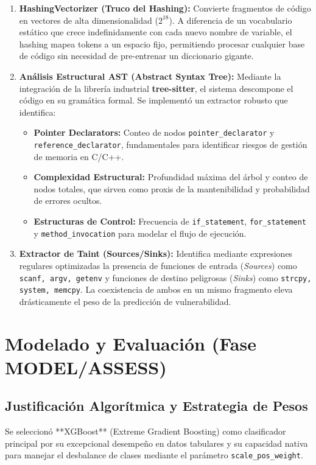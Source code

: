 \documentclass[11pt,a4paper]{article}
\begin{document}
\begin{enumerate}
    \item \textbf{HashingVectorizer (Truco del Hashing):} Convierte fragmentos de código en vectores de alta dimensionalidad ($2^{18}$). A diferencia de un vocabulario estático que crece indefinidamente con cada nuevo nombre de variable, el hashing mapea tokens a un espacio fijo, permitiendo procesar cualquier base de código sin necesidad de pre-entrenar un diccionario gigante.
    \item \textbf{Análisis Estructural AST (Abstract Syntax Tree):} Mediante la integración de la librería industrial \textbf{tree-sitter}, el sistema descompone el código en su gramática formal. Se implementó un extractor robusto que identifica:
    \begin{itemize}
        \item \textbf{Pointer Declarators:} Conteo de nodos \texttt{pointer\_declarator} y \texttt{reference\_declarator}, fundamentales para identificar riesgos de gestión de memoria en C/C++.
        \item \textbf{Complexidad Estructural:} Profundidad máxima del árbol y conteo de nodos totales, que sirven como proxis de la mantenibilidad y probabilidad de errores ocultos.
        \item \textbf{Estructuras de Control:} Frecuencia de \texttt{if\_statement}, \texttt{for\_statement} y \texttt{method\_invocation} para modelar el flujo de ejecución.
    \end{itemize}
    \item \textbf{Extractor de Taint (Sources/Sinks):} Identifica mediante expresiones regulares optimizadas la presencia de funciones de entrada (\textit{Sources}) como \texttt{scanf, argv, getenv} y funciones de destino peligrosas (\textit{Sinks}) como \texttt{strcpy, system, memcpy}. La coexistencia de ambos en un mismo fragmento eleva drásticamente el peso de la predicción de vulnerabilidad.
\end{enumerate}

\section{Modelado y Evaluación (Fase MODEL/ASSESS)}

\subsection{Justificación Algorítmica y Estrategia de Pesos}
Se seleccionó **XGBoost** (Extreme Gradient Boosting) como clasificador principal por su excepcional desempeño en datos tabulares y su capacidad nativa para manejar el desbalance de clases mediante el parámetro \texttt{scale\_pos\_weight}. 
\end{document}
